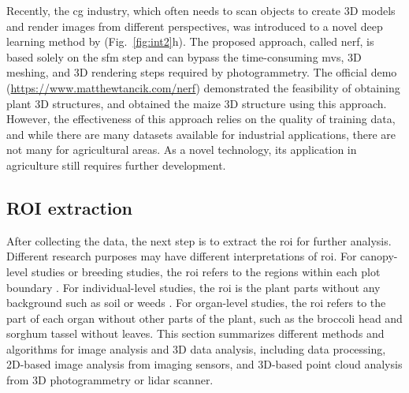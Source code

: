 

Recently, the \gls{cg} industry, which often needs to scan objects to create 3D models and render images from different perspectives, was introduced to a novel deep learning method by \citet{mildenhall_nerf_2022} (Fig.~\ref{fig:int2}h). The proposed approach, called \gls{nerf}, is based solely on the \gls{sfm} step and can bypass the time-consuming \gls{mvs}, 3D meshing, and 3D rendering steps required by photogrammetry. The official demo (\url{https://www.matthewtancik.com/nerf}) demonstrated the feasibility of obtaining plant 3D structures, and \citet{jignasu_plant_2023} obtained the maize 3D structure using this approach. However, the effectiveness of this approach relies on the quality of training data, and while there are many datasets available for industrial applications, there are not many for agricultural areas. As a novel technology, its application in agriculture still requires further development.



\subsection{ROI extraction}

After collecting the data, the next step is to extract the \acrfull{roi} for further analysis. Different research purposes may have different interpretations of \gls{roi}. For canopy-level studies or breeding studies, the \gls{roi} refers to the regions within each plot boundary \citep{trevisan_htp_2020,han_drone_2021}. For individual-level studies, the \gls{roi} is the plant parts without any background such as soil or weeds \citep{ge_method_2019,guo_fieldbased_2020}. For organ-level studies, the \gls{roi} refers to the part of each organ without other parts of the plant, such as the broccoli head \citep{zhou_monitoring_2020} and sorghum tassel \citep{ghosal_weakly_2019} without leaves. This section summarizes different methods and algorithms for image analysis and 3D data analysis, including data processing, 2D-based image analysis from imaging sensors, and 3D-based point cloud analysis from 3D photogrammetry or \gls{lidar} scanner.

